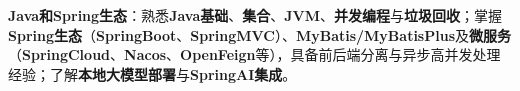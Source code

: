 \item \textbf{Java和Spring生态}：熟悉\textbf{Java基础}、\textbf{集合}、\textbf{JVM}、\textbf{并发编程}与\textbf{垃圾回收}；掌握\textbf{Spring生态}（\textbf{SpringBoot}、\textbf{SpringMVC}）、\textbf{MyBatis/MyBatisPlus}及\textbf{微服务}（\textbf{SpringCloud}、\textbf{Nacos}、\textbf{OpenFeign}等），具备前后端分离与异步高并发处理经验；了解\textbf{本地大模型部署}与\textbf{SpringAI集成}。